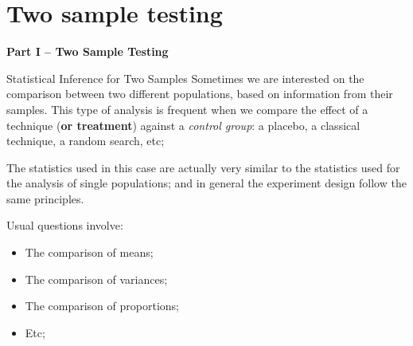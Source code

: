 \section{Two sample testing}

\begin{frame}

  \begin{center}
  {\bf Part I -- Two Sample Testing}
\end{center}

\end{frame}

\begin{frame}{Statistical Inference for Two Samples}
  Sometimes we are interested on the comparison between two different populations, based on information from their samples. This type of analysis is frequent when we compare the effect of a technique ({\bf or treatment}) against a \emph{control group}: a placebo, a classical technique, a random search, etc;\bigskip

  The statistics used in this case are actually very similar to the statistics used for the analysis of single populations; and in general the experiment design follow the same principles.\bigskip

  Usual questions involve:
  \begin{itemize}
    \item The comparison of means;
    \item The comparison of variances;
    \item The comparison of proportions;
    \item Etc;
  \end{itemize}
\end{frame}

